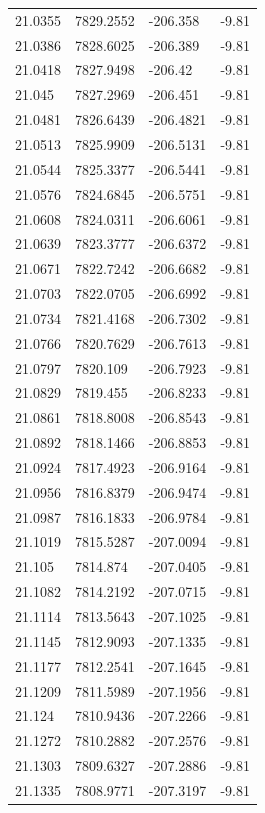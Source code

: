 \begin{table}[H]
\begin{tabular}{llll}
21.0355 & 7829.2552 & -206.358 & -9.81 \\
21.0386 & 7828.6025 & -206.389 & -9.81 \\
21.0418 & 7827.9498 & -206.42 & -9.81 \\
21.045 & 7827.2969 & -206.451 & -9.81 \\
21.0481 & 7826.6439 & -206.4821 & -9.81 \\
21.0513 & 7825.9909 & -206.5131 & -9.81 \\
21.0544 & 7825.3377 & -206.5441 & -9.81 \\
21.0576 & 7824.6845 & -206.5751 & -9.81 \\
21.0608 & 7824.0311 & -206.6061 & -9.81 \\
21.0639 & 7823.3777 & -206.6372 & -9.81 \\
21.0671 & 7822.7242 & -206.6682 & -9.81 \\
21.0703 & 7822.0705 & -206.6992 & -9.81 \\
21.0734 & 7821.4168 & -206.7302 & -9.81 \\
21.0766 & 7820.7629 & -206.7613 & -9.81 \\
21.0797 & 7820.109 & -206.7923 & -9.81 \\
21.0829 & 7819.455 & -206.8233 & -9.81 \\
21.0861 & 7818.8008 & -206.8543 & -9.81 \\
21.0892 & 7818.1466 & -206.8853 & -9.81 \\
21.0924 & 7817.4923 & -206.9164 & -9.81 \\
21.0956 & 7816.8379 & -206.9474 & -9.81 \\
21.0987 & 7816.1833 & -206.9784 & -9.81 \\
21.1019 & 7815.5287 & -207.0094 & -9.81 \\
21.105 & 7814.874 & -207.0405 & -9.81 \\
21.1082 & 7814.2192 & -207.0715 & -9.81 \\
21.1114 & 7813.5643 & -207.1025 & -9.81 \\
21.1145 & 7812.9093 & -207.1335 & -9.81 \\
21.1177 & 7812.2541 & -207.1645 & -9.81 \\
21.1209 & 7811.5989 & -207.1956 & -9.81 \\
21.124 & 7810.9436 & -207.2266 & -9.81 \\
21.1272 & 7810.2882 & -207.2576 & -9.81 \\
21.1303 & 7809.6327 & -207.2886 & -9.81 \\
21.1335 & 7808.9771 & -207.3197 & -9.81 \\

\end{tabular}
\end{table}
